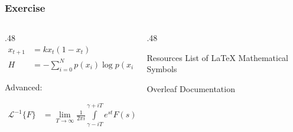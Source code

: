 \begin{frame}
    \frametitle{Exercise}
    \begin{columns}
        \begin{column}{.48\textwidth}
            \begin{align*}
                x_{t+1} 
                    &= kx_t (1 - x_t) \\[1.2em]
                H 
                    &= - \sum_{i = 0}^{N} p(x_i) \log p(x_i)
            \end{align*}
            \begin{center}
                Advanced:
            \end{center}
            \begin{align*}
                \mathcal{L}^{-1}\{F\} 
                    &=  \lim_{T \to \infty}
                        \frac{1}{2\pi i}
                        \int\limits_{\gamma - iT}^{\gamma + iT}
                        e^{st} F(s) \,\mathrm{d}s
            \end{align*}
        \end{column}
        \begin{column}{.48\textwidth}
            \begin{block}{\blockstrut Resources}
                \centering
                List of \LaTeX{} Mathematical Symbols

                \medskip
                
                
                \bigskip
                Overleaf Documentation
                
                \medskip
            \end{block}
        \end{column}
    \end{columns}
\end{frame}
